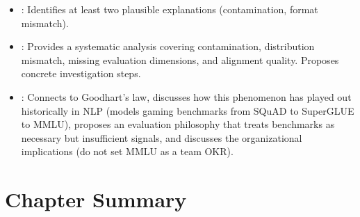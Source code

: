 \begin{interviewq}

\goodgreat
\begin{itemize}
    \item {}: Identifies at least two plausible explanations
          (contamination, format mismatch).
    \item {}: Provides a systematic analysis covering contamination,
          distribution mismatch, missing evaluation dimensions, and alignment
          quality.  Proposes concrete investigation steps.
    \item {}: Connects to Goodhart's law, discusses how this
          phenomenon has played out historically in NLP (models gaming benchmarks
          from SQuAD to SuperGLUE to MMLU), proposes an evaluation philosophy
          that treats benchmarks as necessary but insufficient signals, and
          discusses the organizational implications (do not set MMLU as a team
          OKR).
\end{itemize}

\end{interviewq}

\bigskip

\section*{Chapter Summary}

